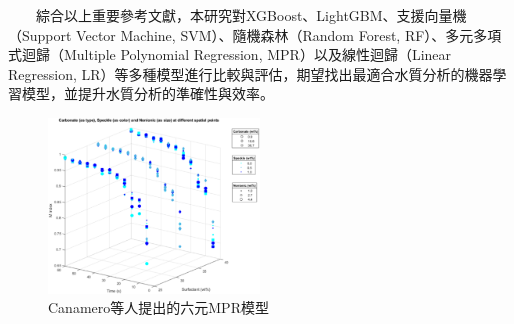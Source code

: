 \documentclass[12pt,a4paper]{article}
\begin{document}
\begin{enumerate}
\begin{enumerate}[label=\arabic*.]
　　綜合以上重要參考文獻，本研究對XGBoost、LightGBM、支援向量機（Support Vector Machine, SVM）、隨機森林（Random Forest, RF）、多元多項式迴歸（Multiple Polynomial Regression, MPR）以及線性迴歸（Linear Regression, LR）等多種模型進行比較與評估，期望找出最適合水質分析的機器學習模型，並提升水質分析的準確性與效率。
    \begin{figure}[H]
        \centering
        \includegraphics[width=0.5\textwidth]{resources/image/Canamero et al.(2023).png}
        \caption{Canamero等人提出的六元MPR模型}
        \label{fig:MPR_validation}
    \end{figure}
\end{enumerate}


\end{enumerate}
\end{document}
